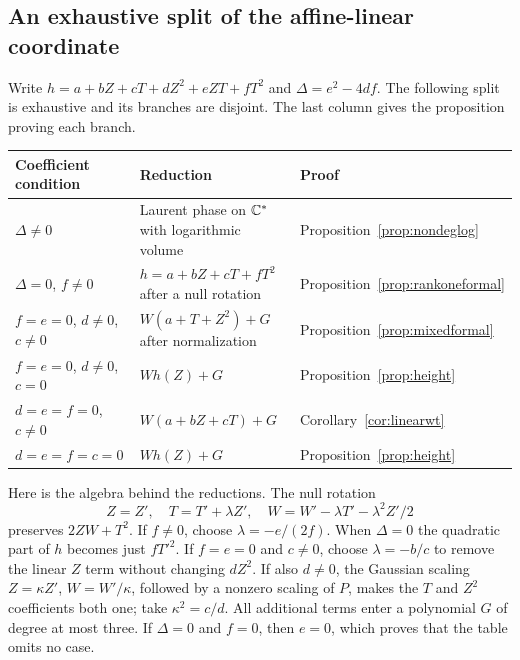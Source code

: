 \subsection{An exhaustive split of the affine-linear coordinate}\label{sec:wsplit}

Write $h=a+bZ+cT+dZ^2+eZT+fT^2$ and
$\Delta=e^2-4df$. The following split is exhaustive and its branches
are disjoint. The last column gives the proposition proving each branch.

\begin{center}\small
\begin{tabular}{@{}p{}p{}p{}@{}}
\toprule
Coefficient condition & Reduction & Proof\\
\midrule
$\Delta\ne0$ & Laurent phase on $\mathbb C^*$ with logarithmic volume &
Proposition~\ref{prop:nondeglog}\\[3pt]
$\Delta=0$, $f\ne0$ & $h=a+bZ+cT+fT^2$ after a null rotation &
Proposition~\ref{prop:rankoneformal}\\[3pt]
$f=e=0$, $d\ne0$, $c\ne0$ &
$W(a+T+Z^2)+G$ after normalization &
Proposition~\ref{prop:mixedformal}\\[3pt]
$f=e=0$, $d\ne0$, $c=0$ & $Wh(Z)+G$ &
Proposition~\ref{prop:height}\\[3pt]
$d=e=f=0$, $c\ne0$ & $W(a+bZ+cT)+G$ &
Corollary~\ref{cor:linearwt}\\[3pt]
$d=e=f=c=0$ & $Wh(Z)+G$ &
Proposition~\ref{prop:height}\\
\bottomrule
\end{tabular}
\end{center}

Here is the algebra behind the reductions. The null rotation
\[
 Z=Z',\quad T=T'+\lambda Z',\quad
 W=W'-\lambda T'-\lambda^2Z'/2
\]
preserves $2ZW+T^2$. If $f\ne0$, choose $\lambda=-e/(2f)$.
When $\Delta=0$ the quadratic part of $h$ becomes just $fT'^2$.
If $f=e=0$ and $c\ne0$, choose $\lambda=-b/c$ to remove the
linear $Z$ term without changing $dZ^2$. If also $d\ne0$, the
Gaussian scaling $Z=\kappa Z'$, $W=W'/\kappa$, followed by a
nonzero scaling of $P$, makes the $T$ and $Z^2$ coefficients both
one; take $\kappa^2=c/d$. All additional terms enter a polynomial
$G$ of degree at most three. If $\Delta=0$ and $f=0$, then $e=0$,
which proves that the table omits no case.

